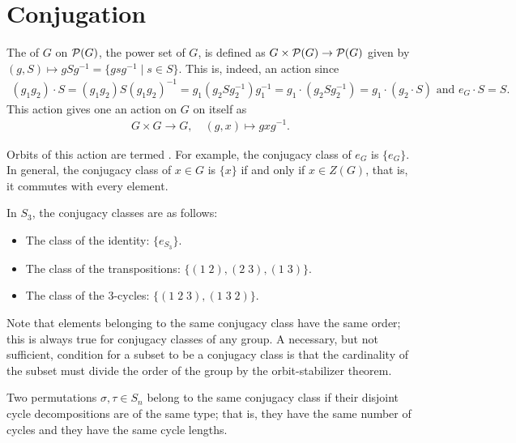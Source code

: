 \section{Conjugation}

The  of $G$ on $\mathcal{P}(G)$, the power set of $G$, is defined as $G \times \mathcal{P}(G) \to \mathcal{P}(G)$ given by $(g,S) \mapsto gSg^{-1} = \{gsg^{-1} \mid s \in S\}$. This is, indeed, an action since
\begin{align}
    (g_{1}g_{2}) \cdot S = (g_{1}g_{2})S(g_{1}g_{2})^{-1} = g_{1}(g_{2}Sg_{2}^{-1})g_{1}^{-1} = g_{1} \cdot (g_{2}Sg_{2}^{-1}) = g_{1} \cdot (g_{2} \cdot S) \text{ and } e_{G} \cdot S = S.
\end{align}
This action gives one an action on $G$ on itself as
\begin{align}
    G \times G \to G, \quad (g,x) \mapsto gxg^{-1}.
\end{align}

Orbits of this action are termed . For example, the conjugacy class of $e_{G}$ is $\{e_{G}\}$. In general, the conjugacy class of $x \in G$ is $\{x\}$ if and only if $x \in Z(G)$, that is, it commutes with every element.

\begin{example}
    In $S_{3}$, the conjugacy classes are as follows:
    \begin{itemize}
        \item The class of the identity: $\{e_{S_{3}}\}$.
        \item The class of the transpositions: $\{(1\;2),(2\;3),(1\;3)\}$.
        \item The class of the 3-cycles: $\{(1\;2\;3),(1\;3\;2)\}$.
    \end{itemize}
    Note that elements belonging to the same conjugacy class have the same order; this is always true for conjugacy classes of any group. A necessary, but not sufficient, condition for a subset to be a conjugacy class is that the cardinality of the subset must divide the order of the group by the orbit-stabilizer theorem.
\end{example}

\begin{proposition}
    Two permutations $\sigma,\tau \in S_{n}$ belong to the same conjugacy class if their disjoint cycle decompositions are of the same type; that is, they have the same number of cycles and they have the same cycle lengths.
\end{proposition}

